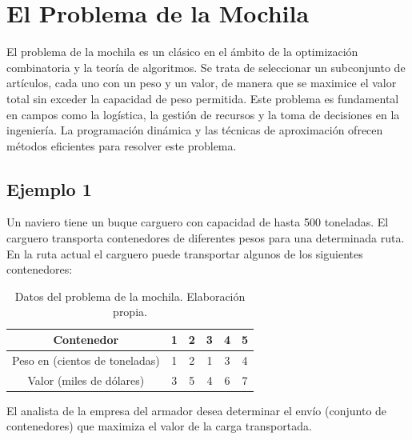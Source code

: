 \section{El Problema de la Mochila}
El problema de la mochila es un clásico en el ámbito de la optimización combinatoria y la teoría de algoritmos. Se trata de seleccionar un subconjunto de artículos, cada uno con un peso y un valor, de manera que se maximice el valor total sin exceder la capacidad de peso permitida. Este problema es fundamental en campos como la logística, la gestión de recursos y la toma de decisiones en la ingeniería. La programación dinámica y las técnicas de aproximación ofrecen métodos eficientes para resolver este problema.

\subsection{Ejemplo 1}
Un naviero tiene un buque carguero con capacidad de hasta 500 toneladas. El carguero transporta contenedores de diferentes pesos para una determinada ruta. En la ruta actual el carguero puede transportar algunos de los siguientes contenedores:

\begin{table}[H]
    \centering
    \begin{tabular}{cccccc}
        \toprule
        \textbf{Contenedor} & 1 & 2 & 3 & 4 & 5 \\
        \midrule
        Peso en (cientos de toneladas) & 1 & 2 & 1 & 3 & 4 \\
        Valor (miles de dólares) & 3 & 5 & 4 & 6 & 7 \\
        \bottomrule
    \end{tabular}
    \caption{Datos del problema de la mochila. Elaboración propia.}
    \label{tab:datos_contenedores}
\end{table}

El analista de la empresa del armador desea determinar el envío (conjunto de contenedores) que maximiza el valor de la carga transportada.

